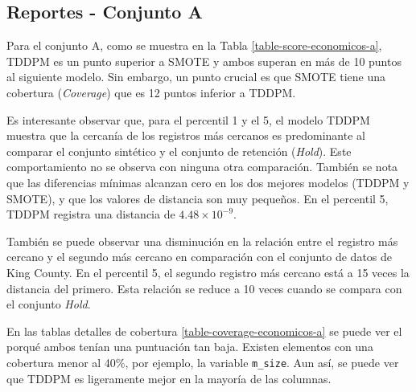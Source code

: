 \newpage
\subsection{Reportes - Conjunto A}
\label{ds-conjunto-a}
Para el conjunto A, como se muestra en la Tabla \ref{table-score-economicos-a}, TDDPM es un punto superior a SMOTE y ambos superan en más de 10 puntos al siguiente modelo. Sin embargo, un punto crucial es que SMOTE tiene una cobertura (\emph{Coverage}) que es 12 puntos inferior a TDDPM.



\newpage
Es interesante observar que, para el percentil 1 y el 5, el modelo TDDPM muestra que la cercanía de los registros más cercanos es predominante al comparar el conjunto sintético y el conjunto de retención (\emph{Hold}). Este comportamiento no se observa con ninguna otra comparación. También se nota que las diferencias mínimas alcanzan cero en los dos mejores modelos (TDDPM y SMOTE), y que los valores de distancia son muy pequeños. En el percentil 5, TDDPM registra una distancia de $4.48 \times 10^{-9}$.






\newpage
También se puede observar una disminución en la relación entre el registro más cercano y el segundo más cercano en comparación con el conjunto de datos de King County. En el percentil 5, el segundo registro más cercano está a 15 veces la distancia del primero. Esta relación se reduce a 10 veces cuando se compara con el conjunto \emph{Hold}.




\newpage
En las tablas detalles de cobertura \ref{table-coverage-economicos-a} se puede ver el porqué ambos tenían una puntuación tan baja. Existen elementos con una cobertura menor al 40\%, por ejemplo, la variable \texttt{m\_size}. Aun así, se puede ver que TDDPM es ligeramente mejor en la mayoría de las columnas.

%


